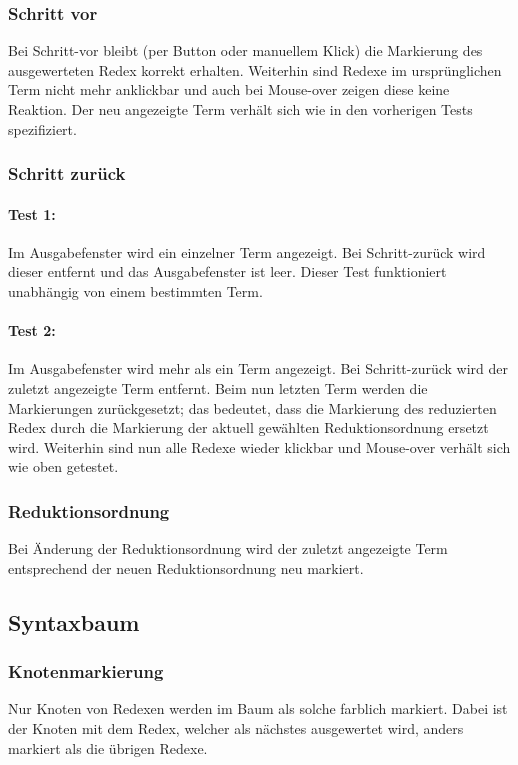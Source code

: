 \documentclass[parskip=full,11pt,openany]{scrreprt}
\begin{document}
\subsubsection{Schritt vor}
Bei Schritt-vor bleibt (per Button oder manuellem Klick) die Markierung des ausgewerteten Redex korrekt erhalten. Weiterhin sind Redexe im ursprünglichen Term nicht mehr anklickbar und auch bei Mouse-over zeigen diese keine Reaktion. Der neu angezeigte Term verhält sich wie in den vorherigen Tests spezifiziert.

\subsubsection{Schritt zurück}
\paragraph{Test 1:} 
Im Ausgabefenster wird ein einzelner Term angezeigt. Bei Schritt-zurück wird dieser entfernt und das Ausgabefenster ist leer. 
Dieser Test funktioniert unabhängig von einem bestimmten Term.

\paragraph{Test 2:} 
Im Ausgabefenster wird mehr als ein Term angezeigt. Bei Schritt-zurück wird der zuletzt angezeigte Term entfernt.
Beim nun letzten Term werden die Markierungen zurückgesetzt; das bedeutet, dass die Markierung des reduzierten Redex durch die Markierung der aktuell gewählten Reduktionsordnung ersetzt wird. 
Weiterhin sind nun alle Redexe wieder klickbar und Mouse-over verhält sich wie oben getestet.

\subsubsection{Reduktionsordnung}
Bei Änderung der Reduktionsordnung wird der zuletzt angezeigte Term entsprechend der neuen Reduktionsordnung neu markiert. 

\subsection{Syntaxbaum} \label{Baumtests}
\subsubsection{Knotenmarkierung}
Nur Knoten von Redexen werden im Baum als solche farblich markiert. Dabei ist der Knoten mit dem Redex, welcher als nächstes ausgewertet wird, anders markiert als die übrigen Redexe.
\end{document}

